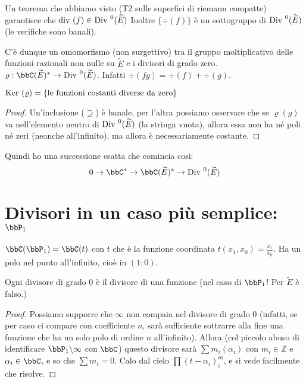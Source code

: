 Un teorema che abbiamo visto (T2 sulle superfici di riemann compatte) garantisce che $\mbox{div }(f) \in \mbox{Div }^0(\widetilde{E})$
Inoltre $\{\div(f)\}$ è un sottogruppo di $\mbox{Div }^0(\widetilde{E})$ (le verifiche sono banali).

C'è dunque un omomorfismo (non surgettivo) tra il gruppo moltiplicativo delle funzioni razionali non nulle su $\widetilde{E}$ e i divisori di grado zero.
$\varrho: \bbC(\widetilde E)^* \rightarrow \Div^0(\widetilde{E})$. Infatti $\div(fg)=\div(f)+\div(g)$.

\begin{proposizione}
$\mbox{Ker }(\varrho) = \{\text{le funzioni costanti diverse da zero}\}$
\end{proposizione}
\begin{proof}
Un'inclusione ($\supseteq$) è banale, per l'altra possiamo osservare che se $\varrho(g)$ va nell'elemento
neutro di $\mbox{Div }^0(\widetilde{E})$ (la stringa vuota), allora essa non ha né poli né zeri (neanche all'infinito), ma allora è necessariamente costante.
\end{proof}

\begin{osservazione}
Quindi ho una successione esatta che comincia così:
$$0 \rightarrow \bbC^* \rightarrow \bbC(\widetilde{E})^* \rightarrow \Div^0(\widetilde{E})$$
\end{osservazione}


\section{Divisori in un caso più semplice: $\bbP_1$}
$\bbC(\bbP_1) = \bbC(t)$ con $t$ che è la funzione coordinata $t(x_1, x_0)=\frac{x_1}{x_0}$.
Ha un polo nel punto all'infinito, cioè in $(1:0)$.

\begin{proposizione}
Ogni divisore di grado $0$ è il divisore di una funzione (nel caso di $\bbP_1$! Per $\widetilde E$ è falso.)
\end{proposizione}
\begin{proof}
Possiamo supporre che $\infty$ non compaia nel divisore di grado $0$ (infatti, se per caso ci compare con coefficiente $n$,
sarà sufficiente sottrarre alla fine una funzione che ha un solo polo di ordine $n$ all'infinito).
Allora (col piccolo abuso di identificare $\bbP_1 \backslash \infty$ con $\bbC$)
questo divisore sarà $\sum m_i (\alpha_i)$ con $m_i \in \mathbb{Z}$ e $\alpha_i \in \bbC$, e so che $\sum m_i=0$.
Calo dal cielo $\prod(t-\alpha_i)^m_i$, e si vede facilmente che risolve.
\end{proof}


